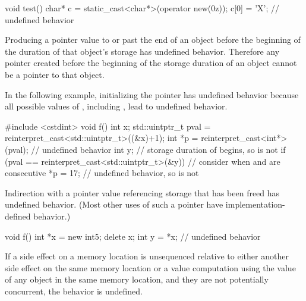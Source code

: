 \pnum
\begin{example}
\begin{codeblock}
void test()
{
    char* c = static_cast<char*>(operator new(0z));
    c[0] = 'X';     // undefined behavior
}
\end{codeblock}
\end{example}


\pnum
Producing a pointer value
to or past the end of an object
before the beginning of the
duration of that object's storage
has undefined behavior.
Therefore
any pointer created
before the beginning of the storage duration
of an object
cannot be a pointer
to that object.

\pnum
\begin{example}
In the following example,
initializing the pointer 
has undefined behavior
because all possible values of ,
including ,
lead to undefined behavior.
\begin{codeblock}
#include <cstdint>
void f() {
  int x;
  std::uintptr_t pval = reinterpret_cast<std::uintptr_t>((&x)+1);
  int *p = reinterpret_cast<int*>(pval);    // undefined behavior
  {
    int y;          // storage duration of  begins, so  is not 
    if (pval == reinterpret_cast<std::uintptr_t>(&y)) { // consider when  and  are consecutive
      *p = 17;      // undefined behavior, so  is not 
    }
  }
}
\end{codeblock}
\end{example}


\pnum
Indirection
with a pointer value referencing storage that has been freed
has undefined behavior.
(Most other uses of such a pointer have implementation-defined behavior.)

\pnum
\begin{example}
\begin{codeblock}
void f()
{
    int *x = new int{5};
    delete x;
    int y = *x; // undefined behavior
}
\end{codeblock}
\end{example}


\pnum
If a side effect on a memory location
is unsequenced relative to either another side effect
on the same memory location
or a value computation using the value of any object
in the same memory location,
and they are not potentially concurrent,
the behavior is undefined.

